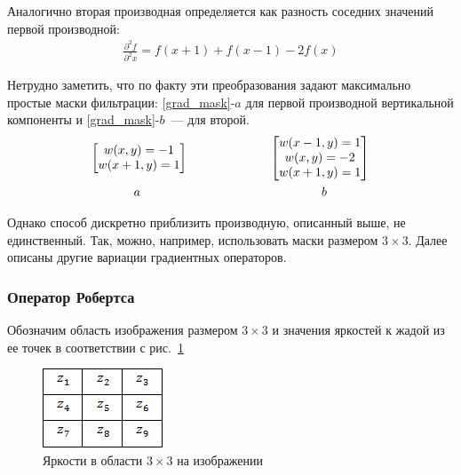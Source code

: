 \documentclass[12pt]{article} %
\begin{document}
Аналогично вторая производная определяется как разность соседних значений первой производной:
\begin{gather}\label{second}
	\frac{\partial^2 f}{\partial^2 x}=
	f(x+1) + f(x-1) -2f(x)
\end{gather}

Нетрудно заметить, что по факту эти преобразования задают максимально простые маски фильтрации:
\ref{grad_mask}-$a$ для первой производной вертикальной компоненты и \ref{grad_mask}-$b$~--- для второй.
\begin{gather}\label{grad_mask}
	\begin{bmatrix} w(x,y)=-1 \\ w(x+1,y)=1 \end{bmatrix}
	~~~~~~~~~~~~~~~~~~~~
	\begin{bmatrix} 
	w(x-1,y)=1 \\ w(x,y)=-2 \\ w(x+1,y)=1 \\
	\end{bmatrix}\\
a~~~~~~~~~~~~~~~~~~~~~~~~~~~~~~~~~~~~~~~~~~~~b\notag
\end{gather}

Однако способ дискретно приблизить производную, описанный выше, не единственный. Так, можно, например, использовать маски размером $3\times3$. Далее описаны другие вариации градиентных операторов.

\subsubsection{Оператор Робертса}

Обозначим область изображения размером $3\times 3$ и значения яркостей к жадой из ее точек в соответствии с рис.~\ref{fig:grad_mask_3}

\begin{figure}[h]
	
	\centering
	
	\includegraphics[width=0.2\linewidth]{grad_mask_3.jpg}
	
	\caption{Яркости в области $3\times3$ на изображении}
	
	\label{fig:grad_mask_3}
	
\end{figure}
\end{document}
